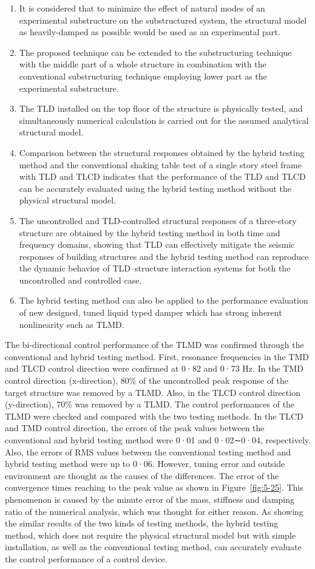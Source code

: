 \begin{enumerate}
\item It is considered that to minimize the effect of natural modes of an experimental substructure on the substructured system, the structural model as heavily-damped as possible would be used as an experimental part.
\item The proposed technique can be extended to the substructuring technique with the middle part of a whole structure in combination with the conventional substructuring technique employing lower part as the experimental substructure.
\item The TLD installed on the top floor of the structure is physically tested, and simultaneously numerical calculation is carried out for the assumed analytical structural model.
\item Comparison between the structural responses obtained by the hybrid testing method and the conventional shaking table test of a single story steel frame with TLD and TLCD indicates that the performance of the TLD and TLCD can be accurately evaluated using the hybrid testing method without the physical structural model.
\item The uncontrolled and TLD-controlled structural responses of a three-story structure are obtained by the hybrid testing method in both time and frequency domains, showing that TLD can effectively mitigate the seismic responses of building structures and the hybrid testing method can reproduce the dynamic behavior of TLD–structure interaction systems for both the uncontrolled and controlled case.
\item The hybrid testing method can also be applied to the performance evaluation of new designed, tuned liquid typed damper which has strong inherent nonlinearity such as TLMD.
\end{enumerate}


The bi-directional control performance of the TLMD was confirmed through the conventional and hybrid testing method. First, resonance frequencies in the TMD and TLCD control direction were confirmed at 0·82 and 0·73 Hz. In the TMD control direction (x-direction), 80\% of the uncontrolled peak response of the target structure was removed by a TLMD. Also, in the TLCD control direction (y-direction), 70\% was removed by a TLMD. 
The control performances of the TLMD were checked and compared with the two testing methods. In the TLCD and TMD control direction, the errors of the peak values between the conventional and hybrid testing method were 0·01 and 0·02∼0·04, respectively. Also, the errors of RMS values between the conventional testing method and hybrid testing method were up to 0·06. However, tuning error and outside environment are thought as the causes of the differences. The error of the convergence times reaching to the peak value as shown in Figure~\ref{fig:5-25}. This phenomenon is caused by the minute error of the mass, stiffness and damping ratio of the numerical analysis, which was thought for either reason. 
As showing the similar results of the two kinds of testing methods, the hybrid testing method, which does not require the physical structural model but with simple installation, as well as the conventional testing method, can accurately evaluate the control performance of a control device.